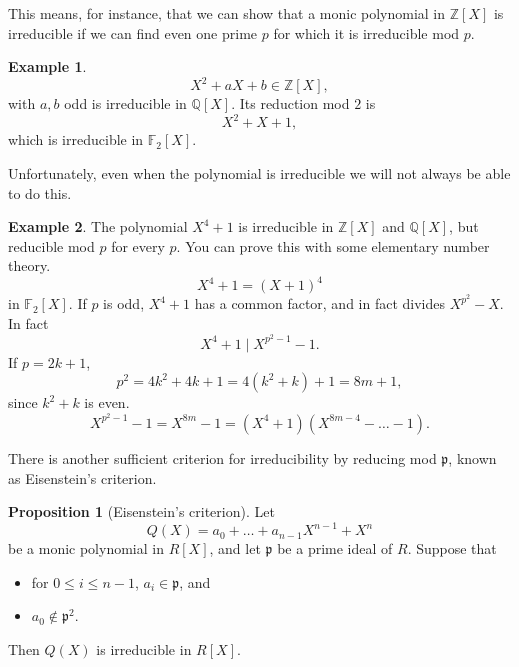 \documentclass{article}
\newcommand{\F}{\mathbb{F}}
\newcommand{\Z}{\mathbb{Z}}
\newcommand{\Q}{\mathbb{Q}}
\newcommand{\rb}[1]{\left( #1 \right)}
\renewcommand{\sb}[1]{\left[ #1 \right]}
\theoremstyle{definition}\newtheorem{definition}{Definition}[subsection]
\theoremstyle{definition}\newtheorem{remark}[definition]{Remark}
\theoremstyle{definition}\newtheorem*{example}{Example}
\theoremstyle{definition}\newtheorem*{note}{Note}
\newtheorem{proposition}[definition]{Proposition}
\begin{document}
This means, for instance, that we can show that a monic polynomial in $ \Z\sb{X} $ is irreducible if we can find even one prime $ p $ for which it is irreducible mod $ p $.

\begin{example}
$$ X^2 + aX + b \in \Z\sb{X}, $$
with $ a, b $ odd is irreducible in $ \Q\sb{X} $. Its reduction mod $ 2 $ is
$$ X^2 + X + 1, $$
which is irreducible in $ \F_2\sb{X} $.
\end{example}

Unfortunately, even when the polynomial is irreducible we will not always be able to do this.

\begin{example}
The polynomial $ X^4 + 1 $ is irreducible in $ \Z\sb{X} $ and $ \Q\sb{X} $, but reducible mod $ p $ for every $ p $. You can prove this with some elementary number theory.
$$ X^4 + 1 = \rb{X + 1}^4 $$
in $ \F_2\sb{X} $. If $ p $ is odd, $ X^4 + 1 $ has a common factor, and in fact divides $ X^{p^2} - X $. In fact
$$ X^4 + 1 \mid X^{p^2 - 1} - 1. $$
If $ p = 2k + 1 $,
$$ p^2 = 4k^2 + 4k + 1 = 4\rb{k^2 + k} + 1 = 8m + 1, $$
since $ k^2 + k $ is even.
$$ X^{p^2 - 1} - 1 = X^{8m} - 1 = \rb{X^4 + 1}\rb{X^{8m - 4} - \dots - 1}. $$
\end{example}

There is another sufficient criterion for irreducibility by reducing mod $ \mathfrak{p} $, known as Eisenstein's criterion.

\begin{proposition}[Eisenstein's criterion]
Let
$$ Q\rb{X} = a_0 + \dots + a_{n - 1}X^{n - 1} + X^n $$
be a monic polynomial in $ R\sb{X} $, and let $ \mathfrak{p} $ be a prime ideal of $ R $. Suppose that
\begin{itemize}
\item for $ 0 \le i \le n - 1 $, $ a_i \in \mathfrak{p} $, and
\item $ a_0 \notin \mathfrak{p}^2 $.
\end{itemize}
Then $ Q\rb{X} $ is irreducible in $ R\sb{X} $.
\end{proposition}
\end{document}
